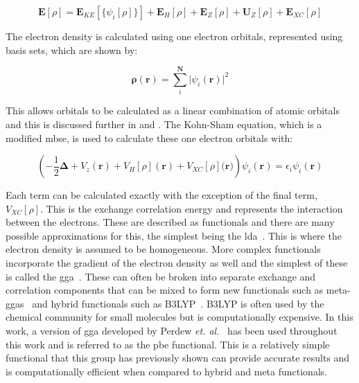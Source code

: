 \begin{equation}
\boldsymbol{E}[\rho] = \boldsymbol{E}_{KE}[\{\psi_i[\rho]\}] + \boldsymbol{E}_{H}[\rho] + \boldsymbol{E}_{Z}[\rho] + \boldsymbol{U}_{Z}[\rho] + \boldsymbol{E}_{XC}[\rho]
\end{equation}

The electron density is calculated using one electron orbitals, represented using basis sets, which are shown by:

\begin{equation}
\boldsymbol{\rho}(\mathbf{r}) = \sum_{i}^{\boldsymbol{N}} \lvert {\psi_i(\mathbf{r})} \rvert ^2
\end{equation}

This allows orbitals to be calculated as a linear combination of atomic orbitals and this is discussed further in  and . The Kohn\nobreakdash-Sham equation, which is a modified \acrshort{mbse}, is used to calculate these one electron orbitals with:

\begin{equation}
\left( -\frac{1}{2}\boldsymbol{\Delta} + V_z(\mathbf{r}) + V_H[\rho](\mathbf{r}) + V_{XC}[\rho](\mathbf{r)}\right) \psi_i(\mathbf{r}) =  \epsilon_i \psi_i (\mathbf{r})
\end{equation}

Each term can be calculated exactly with the exception of the final term, \(V_{XC}[\rho]\). This is the exchange correlation energy and represents the interaction between the electrons. These are described as functionals and there are many possible approximations for this, the simplest being the \acrfull{lda}~\cite{Sahni1988}. This is where the electron density is assumed to be homogeneous. More complex functionals incorporate the gradient of the electron density as well and the simplest of these is called the \acrfull{gga}~\cite{Perdew1996}. These can often be broken into separate exchange and correlation components that can be mixed to form new functionals such as meta\nobreakdash-\acrshort{gga}s~\cite{Furness2021} and hybrid functionals such as B3LYP~\cite{Stephens1994}. B3LYP is often used by the chemical community for small molecules but is computationally expensive. In this work, a version of \acrshort{gga} developed by Perdew \textit{et. al.}~\cite{Perdew1996_2} has been used throughout this work and is referred to as the \acrfull{pbe} functional. This is a relatively simple functional that this group has previously shown can provide accurate results and is computationally efficient when compared to hybrid and meta functionals.

